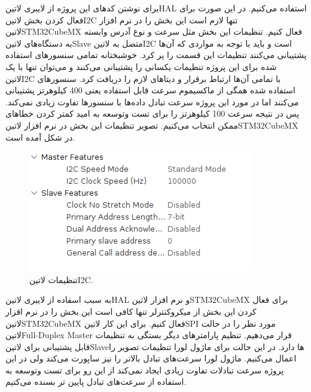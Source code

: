 برای نوشتن کد‌های این پروژه از لایبری ‌لاتین{HAL} استفاده می‌کنیم. در این صورت برای فعال کردن بخش ‌لاتین{I2C} تنها لازم است این بخش را در نرم افزار ‌لاتین{STM32CubeMX} فعال کنیم. تنظیمات این بخش مثل سرعت و نوع آدرس وابسته به دستگاه‌های ‌لاتین{Slave} متصل به ‌لاتین{I2C} است و باید با توجه به مواردی که آن‌ها پشتیبانی می‌کنند تنظیمات این قسمت را پر کرد. خوشبختانه تمامی سنسور‌های استفاده شده برای این پروژه تنظیمات یکسانی را پشتیبانی می‌کنند و می‌توان تنها با یک ‌لاتین{I2C} با تمامی آن‌ها ارتباط برقرار و دیتا‌های لازم را دریافت کرد. سنسور‌های استفاده شده همگی از ماکسیموم سرعت قابل استفاده یعنی 400 کیلوهرتز پشتیبانی می‌کنند اما در مورد این پروژه سرعت تبادل داده‌ها با سنسور‌ها تفاوت زیادی نمی‌کند. پس در نتیجه سرعت 100 کیلوهرتز را برای تست وتوسعه به امید کمتر کردن خطا‌های ممکن انتخاب می‌کنیم. تصویر تنظیمات این بخش در نرم افزار ‌لاتین{STM32CubeMX} در شکل  آمده است. 

\begin{figure}[H]
	\centering
	\includegraphics[width=0.6\linewidth]{Assets/i2cConfig.png}
	\caption{تنظیمات ‌لاتین{I2C}.}
	\label{fig:i2cConfig}
\end{figure}

به سبب اسفاده از لایبری ‌لاتین{HAL} و نرم افزار ‌لاتین{STM32CubeMX} برای فعال کردن این بخش از میکروکنترلر تنها کافی است این بخش را در نرم اقزار ‌لاتین{STM32CubeMX} فعال کنیم. برای این کار ‌لاتین{SPI} مورد نظر را در حالت ‌لاتین{Full-Duplex Master} قرار می‌دهیم. تنظیم پارامتر‌های دیگر بستگی به تنظیمات قابل پشتیبانی برای ‌لاتین{Slave}‌ها دارد. در این حالت برای ماژول لورا تنظیمات تصویر  را اعمال می‌کنیم. ماژول لورا سرعت‌های تبادل بالاتر را نیز ساپورت می‌کند ولی در این پروژه سرعت تبادلات تفاوت زیادی ایجاد نمی‌کند از این رو برای تست وتوسعه به استفاده از سرعت‌های تبادل پایین تر بسنده می‌کتیم. 


